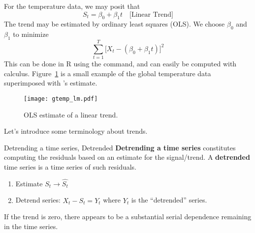 For the temperature data, we may posit that
\[ S_t=\beta_0+\beta_1 t\quad\text{[Linear Trend]} \]
The trend may be estimated by ordinary least squares (OLS).
We choose $ \beta_0 $ and $ \beta_1 $ to minimize
\[ \sum_{t=1}^{T} \bigl[X_t-(\beta_0+\beta_1 t)\bigr]^2 \]
This can be done in R using the  command, and
can easily be computed with calculus. Figure~\ref{fig:gtemp_lm}
is a small example of the global temperature data superimposed
with 's estimate.
\begin{figure}[!ht]
    \centering
    \texttt{[image: gtemp\_lm.pdf]}
    \caption{OLS estimate of a linear trend.}\label{fig:gtemp_lm}
\end{figure}
Let's introduce some terminology about trends.
\begin{Definition}{Detrending a time series, Detrended}{}
    \textbf{Detrending a time series} constitutes computing the
    residuals based on an estimate for the signal/trend. A
    \textbf{detrended} time series is a time series of such residuals.
    \begin{enumerate}
        \item Estimate $ S_t\to \hat{S_t} $
        \item Detrend series: $ X_t-\hat{S_t}=Y_t $
              where $ Y_t $ is the ``detrended'' series.
    \end{enumerate}
\end{Definition}

If the trend is zero, there appears to be a substantial serial
dependence remaining in the time series.
